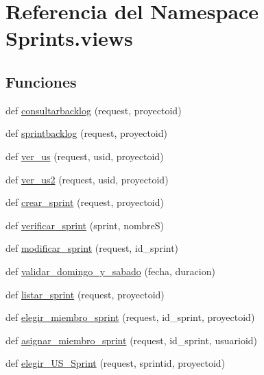 \hypertarget{namespace_sprints_1_1views}{}\section{Referencia del Namespace Sprints.\+views}
\label{namespace_sprints_1_1views}
\subsection*{Funciones}
\begin{DoxyCompactItemize}
\item 
def \hyperlink{namespace_sprints_1_1views_a4a02c8e727157fbeda66bd7d64ce531a}{consultarbacklog} (request, proyectoid)
\item 
def \hyperlink{namespace_sprints_1_1views_a3b2d5e3957b88401f1c2830f71f71a89}{sprintbacklog} (request, proyectoid)
\item 
def \hyperlink{namespace_sprints_1_1views_a5dc69932c54ac7df2a369d4d0d2df084}{ver\+\_\+us} (request, usid, proyectoid)
\item 
def \hyperlink{namespace_sprints_1_1views_afdfae178b947dc622b3c65b5e343eea0}{ver\+\_\+us2} (request, usid, proyectoid)
\item 
def \hyperlink{namespace_sprints_1_1views_ab7b8ebdaab1e20b098021efba519a8ff}{crear\+\_\+sprint} (request, proyectoid)
\item 
def \hyperlink{namespace_sprints_1_1views_ac8946b2f81f4422d5e83ec323b8deeb3}{verificar\+\_\+sprint} (sprint, nombreS)
\item 
def \hyperlink{namespace_sprints_1_1views_a8a17f9923758b5a88432a0ec9031985a}{modificar\+\_\+sprint} (request, id\+\_\+sprint)
\item 
def \hyperlink{namespace_sprints_1_1views_a625af9063d9ffca5a57d017f0963c44e}{validar\+\_\+domingo\+\_\+y\+\_\+sabado} (fecha, duracion)
\item 
def \hyperlink{namespace_sprints_1_1views_ad7f9f4cc707a9c9437a74ca277053ef9}{listar\+\_\+sprint} (request, proyectoid)
\item 
def \hyperlink{namespace_sprints_1_1views_a78d5dcb719c768f1e107a736ae1761cd}{elegir\+\_\+miembro\+\_\+sprint} (request, id\+\_\+sprint, proyectoid)
\item 
def \hyperlink{namespace_sprints_1_1views_a296172e7baa81e4282cfabf46e566c38}{asignar\+\_\+miembro\+\_\+sprint} (request, id\+\_\+sprint, usuarioid)
\item 
def \hyperlink{namespace_sprints_1_1views_a824152c765bfd87c8bdfdaafbfd9d8f7}{elegir\+\_\+\+U\+S\+\_\+\+Sprint} (request, sprintid, proyectoid)

\end{DoxyCompactItemize}
